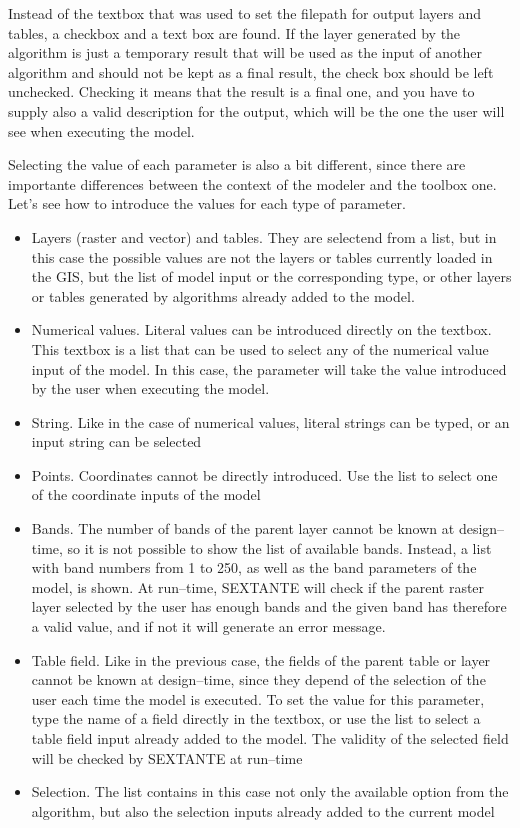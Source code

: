 Instead of the textbox that was used to set the filepath for output layers and tables, a checkbox and a text box are found. If the layer generated by the algorithm is just a temporary result that will be used as the input of another algorithm and should not be kept as a final result, the check box should be left unchecked. Checking it means that the result is a final one, and you have to supply also a valid description for the output, which will be the one the user will see when executing the model. 

Selecting the value of each parameter is also a bit different, since there are importante differences between the context of the modeler and the toolbox one. Let's see how to introduce the values for each type of parameter.
\begin{itemize}
	\item Layers (raster and vector) and tables. They are selectend from a list, but in this case the possible values are not the layers or tables currently loaded in the GIS, but the list of model input or the corresponding type, or other layers or tables generated by algorithms already added to the model.
	\item Numerical values. Literal values can be introduced directly on the textbox. This textbox is a list that can be used to select any of the numerical value input of the model. In this case, the parameter will take the value introduced by the user when executing the model. 
	\item String. Like in the case of numerical values, literal strings can be typed, or an input string can be selected
	\item Points. Coordinates cannot be directly introduced. Use the list to select one of the coordinate inputs of the model
	\item Bands. The number of bands of the parent layer cannot be known at design--time, so it is not possible to show the list of available bands. Instead, a list with band numbers from 1 to 250, as well as the band parameters of the model, is shown. At run--time, SEXTANTE will check if the parent raster layer selected by the user has enough bands and the given band has therefore a valid value, and if not it will generate an error message.
	\item Table field. Like in the previous case, the fields of the parent table or layer cannot be known at design--time, since they depend of the selection of the user each time the model is executed. To set the value for this parameter, type the name of a field directly in the textbox, or use the list to select a table field input already added to the model. The validity of the selected field will be checked by SEXTANTE at run--time
	\item Selection. The list contains in this case not only the available option from the algorithm, but also the selection inputs already added to the current model
\end{itemize}

